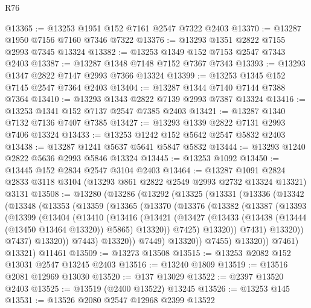 \begin{lexlean}{R76}
\begin{coremodule}
@13365 := @13253 @1951 @152 @7161 @2547 @7322 @2403
@13370 := @13287 @1950 @7156 @7160 @7346 @7322
@13376 := @13293 @1351 @2822 @7155 @2993 @7345 @13324
@13382 := @13253 @1349 @152 @7153 @2547 @7343 @2403
@13387 := @13287 @1348 @7148 @7152 @7367 @7343
@13393 := @13293 @1347 @2822 @7147 @2993 @7366 @13324
@13399 := @13253 @1345 @152 @7145 @2547 @7364 @2403
@13404 := @13287 @1344 @7140 @7144 @7388 @7364
@13410 := @13293 @1343 @2822 @7139 @2993 @7387 @13324
@13416 := @13253 @1341 @152 @7137 @2547 @7385 @2403
@13421 := @13287 @1340 @7132 @7136 @7407 @7385
@13427 := @13293 @1339 @2822 @7131 @2993 @7406 @13324
@13433 := @13253 @1242 @152 @5642 @2547 @5832 @2403
@13438 := @13287 @1241 @5637 @5641 @5847 @5832
@13444 := @13293 @1240 @2822 @5636 @2993 @5846 @13324
@13445 := @13253 @1092
@13450 := @13445 @152 @2834 @2547 @3104 @2403
@13464 := @13287
    @1091
    @2824
    @2833
    @3118
    @3104
    (@13293 @861 @2822 @2549 @2993 @2732 @13324 @13321)
    @3131
@13508 := @13280
    (@13286
      (@13292
        (@13325
          (@13331
            (@13336
              (@13342
                (@13348
                  (@13353
                    (@13359
                      (@13365
                        (@13370
                          (@13376
                            (@13382
                              (@13387
                                (@13393
                                  (@13399
                                    (@13404
                                      (@13410
                                        (@13416
                                          (@13421
                                            (@13427
                                              (@13433
                                                (@13438 (@13444 (@13450 @13464 @13320)) @5865)
                                                @13320))
                                            @7425)
                                          @13320))
                                      @7431)
                                    @13320))
                                @7437)
                              @13320))
                          @7443)
                        @13320))
                    @7449)
                  @13320))
              @7455)
            @13320))
        @7461)
      @13321)
    @11461
@13509 := @13273 @13508
@13515 := @13253 @2082 @152 @13031 @2547 @13245 @2403
@13516 := @13240 @1809
@13519 := @13516 @2081 @12969 @13030
@13520 := @137 @13029
@13522 := @2397 @13520 @2403
@13525 := @13519 (@2400 @13522) @13245
@13526 := @13253 @145
@13531 := @13526 @2080 @2547 @12968 @2399 @13522

\end{coremodule}
\end{lexlean}
